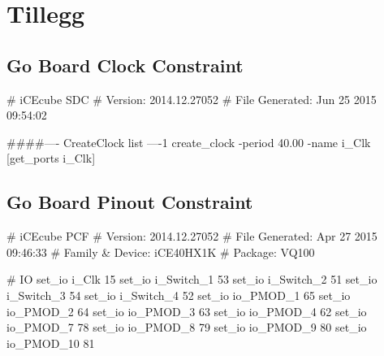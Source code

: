 \appendix

\section{Tillegg}

\subsection{Go Board Clock Constraint}
\begin{verilogcode}
# iCEcube SDC                                               
# Version:            2014.12.27052                         
# File Generated:     Jun 25 2015 09:54:02                  

####---- CreateClock list ----1
create_clock  -period 40.00 -name {i_Clk} [get_ports {i_Clk}] 
\end{verilogcode}

\subsection{Go Board Pinout Constraint}
\begin{verilogcode}
# iCEcube PCF                                               
# Version:            2014.12.27052                         
# File Generated:     Apr 27 2015 09:46:33                  
# Family & Device:    iCE40HX1K                             
# Package:            VQ100                                 

# IO
set_io i_Clk 15
set_io i_Switch_1 53
set_io i_Switch_2 51
set_io i_Switch_3 54
set_io i_Switch_4 52
set_io io_PMOD_1 65
set_io io_PMOD_2 64
set_io io_PMOD_3 63
set_io io_PMOD_4 62
set_io io_PMOD_7 78
set_io io_PMOD_8 79
set_io io_PMOD_9 80
set_io io_PMOD_10 81
\end{verilogcode}
